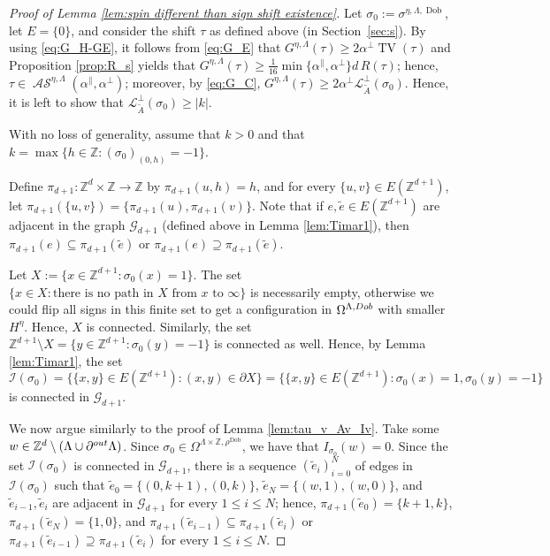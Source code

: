 \documentclass[11pt, reqno]{amsart}
\newcommand{\Z}{\mathbb{Z}}
\DeclareMathOperator{\Dob}{Dob}
\DeclareMathOperator{\TV}{TV}
\DeclareMathOperator{\AS}{\mathcal{AS}}
\numberwithin{equation}{section}
\begin{document}
\begin{proof}[Proof of Lemma \ref{lem:spin different than sign shift existence}]
Let $\sigma_0:=\sigma^{\eta,\Lambda,\Dob}$, let $E=\{0\}$, and consider
the shift ${\tau}$ as defined above (in Section~\ref{sec:s}). 
By using \eqref{eq:G_H-GE}, it follows from \eqref{eq:G_E} that
$G^{\eta,\Lambda}({\tau})\geq    
2\alpha^{\perp}\TV({\tau})$ and Proposition \ref{prop:R_s} yields that $G^{\eta,\Lambda}({\tau})\geq \frac{1}{16}\min\{\alpha^{\parallel},\alpha^{\perp}\}d\, R({\tau})$; hence, ${\tau}\in \AS^{\eta,\Lambda}(\alpha^{\parallel}, \alpha^{\perp})$; moreover, by \eqref{eq:G_C}, $G^{\eta,\Lambda}({\tau})\geq 2\alpha^{\perp}\mathcal{L}^{\perp}_{\tilde{A}}\left(\sigma_0\right)$.
Hence, it is left to show that $\mathcal{L}^{\perp}_{\tilde{A}}\left(\sigma_0\right)\geq \lvert k\rvert$.

With no loss of generality, assume that $k>0$ and that $k=\max\{h\in{\mathbb Z}\colon (\sigma_0)_{(0,h)}=-1\}$.

Define $\pi_{d+1}:{\mathbb Z}^d\times{\mathbb Z}\to{\mathbb Z}$ by $\pi_{d+1}(u,h)=h$, and for every $\{u,v\}\in E({\mathbb Z}^{d+1})$, let $\pi_{d+1}(\{u,v\})=\{\pi_{d+1}(u),\pi_{d+1}(v)\}$.
Note that if $e,\tilde{e}\in E({\mathbb Z}^{d+1})$ are adjacent in the graph ${\mathcal G}_{d+1}$ (defined above in Lemma \ref{lem:Timar1}), then $\pi_{d+1}(e)\subseteq\pi_{d+1}(\tilde{e})$ or $\pi_{d+1}(e)\supseteq\pi_{d+1}(\tilde{e})$.

Let $X:=\{x\in{\mathbb Z}^{d+1}\colon \sigma_0(x)=1\}$. The set $\{x\in 
X\colon \text{there is no path in } X \text{ from } x\text{ to } \infty\}$ is necessarily empty, otherwise we could flip all signs in this finite set to get a configuration in $\Omega^{\Lambda,{\rm Dob}}$ with smaller $H^{\eta}$.
Hence, $X$ is connected. 
Similarly, the set ${\mathbb Z}^{d+1}\setminus X=\{y\in{\mathbb Z}^{d+1}\colon \sigma_0(y)=-1\}$ is connected as well. 
Hence, by Lemma \ref{lem:Timar1},
the set 
$${\mathcal I}(\sigma_0)=\{\{x,y\}\in E({\mathbb Z}^{d+1})\colon (x,y)\in\partial X\}=\{\{x,y\}\in E({\mathbb Z}^{d+1})\colon \sigma_0(x)=1, \sigma_0(y)=-1\}$$ 
is connected in ${\mathcal G}_{d+1}$.

We now argue similarly to the proof of Lemma \ref{lem:tau_v_Av_Iv}.
Take some $w \in \Z^{d} \setminus(\Lambda\cup\partial^{\rm out}\Lambda)$.
Since $\sigma_{0} \in \Omega^{\Lambda\times\Z, \rho^{\Dob}} $, we have that $I_{\sigma_0}(w)=0$.
Since the set ${\mathcal I}(\sigma_0)$ is connected in ${\mathcal G}_{d+1}$, there is a sequence $(\tilde{e}_i)_{i=0}^N$ of edges in ${\mathcal I}(\sigma_0)$ such that 
$\tilde{e}_0=\{(0,k+1),(0,k)\}$, $\tilde{e}_N=\{(w,1),(w,0)\}$, and $\tilde{e}_{i-1}, \tilde{e}_i$ are adjacent in ${\mathcal G}_{d+1}$ for every $1\leq i\leq N$; hence, $\pi_{d+1}(\tilde{e}_0)=\{k+1,k\}$, $\pi_{d+1}(\tilde{e}_N)=\{1,0\}$, and $\pi_{d+1}(\tilde{e}_{i-1})\subseteq\pi_{d+1}(\tilde{e}_i)$ or $\pi_{d+1}(\tilde{e}_{i-1})\supseteq\pi_{d+1}(\tilde{e}_i)$ for every $1\leq i\leq N$.


\end{proof}
\end{document}
